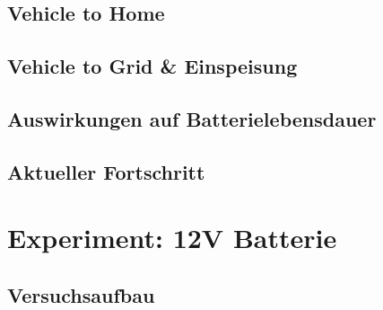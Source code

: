 \documentclass[12pt, ngerman]{article}
\begin{document}
\subsection{Vehicle to Home}

\subsection{Vehicle to Grid \& Einspeisung}

\subsection{Auswirkungen auf Batterielebensdauer}

\subsection{Aktueller Fortschritt}


\section{Experiment: 12V Batterie}

\subsection{Versuchsaufbau}
\end{document}
